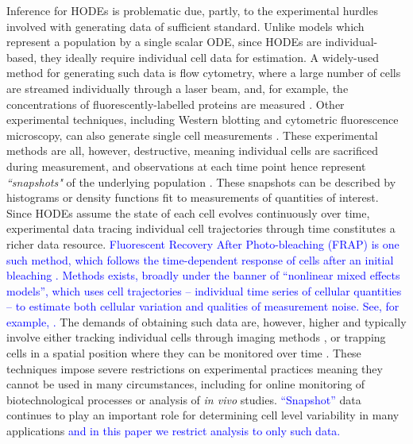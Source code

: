 Inference for HODEs is problematic due, partly, to the experimental hurdles involved with generating data of sufficient standard. Unlike models which represent a population by a single scalar ODE, since HODEs are individual-based, they ideally require individual cell data for estimation. A widely-used method for generating such data is flow cytometry, where a large number of cells are streamed individually through a laser beam, and, for example, the concentrations of fluorescently-labelled proteins are measured \cite{telford2012flow}. Other experimental techniques, including Western blotting and cytometric fluorescence microscopy, can also generate single cell measurements \cite{hughes2014single,hasenauer2011identification}. These experimental methods are all, however, destructive, meaning individual cells are sacrificed during measurement, and observations at each time point hence represent \emph{``snapshots"} of the underlying population \cite{hasenauer2011identification}. These snapshots can be described by histograms \cite{dixit2018maximum} or density functions \cite{waldherr2018estimation} fit to measurements of quantities of interest. Since HODEs assume the state of each cell evolves continuously over time, experimental data tracing individual cell trajectories through time constitutes a richer data resource. \textcolor{blue}{Fluorescent Recovery After Photo-bleaching (FRAP) is one such method, which follows the time-dependent response of cells after an initial bleaching \cite{karlsson2015nonlinear}. Methods exists, broadly under the banner of ``nonlinear mixed effects models'', which uses cell trajectories -- individual time series of cellular quantities -- to estimate both cellular variation and qualities of measurement noise. See, for example, \cite{karlsson2015nonlinear,zechner2014scalable,dharmarajan2019simple}.} The demands of obtaining such data are, however, higher and typically involve either tracking individual cells through imaging methods \cite{hilsenbeck2016software}, or trapping cells in a spatial position where they can be monitored over time \cite{fritzsch2012single}. These techniques impose severe restrictions on experimental practices meaning they cannot be used in many circumstances, including for online monitoring of biotechnological processes or analysis of \textit{in vivo} studies. \textcolor{blue}{``Snapshot''} data continues to play an important role for determining cell level variability in many applications \textcolor{blue}{and in this paper we restrict analysis to only such data.}

